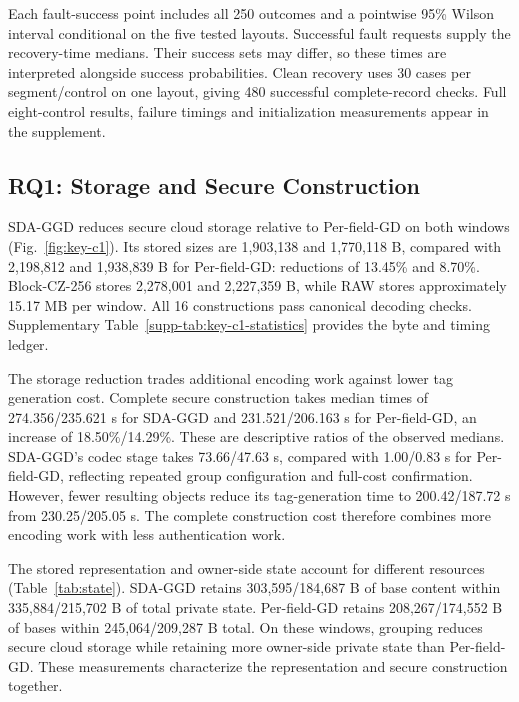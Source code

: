 \documentclass[10pt,journal]{IEEEtran}
\begin{document}
Each fault-success point includes all 250 outcomes and a pointwise 95\%
Wilson interval conditional on the five tested layouts. Successful fault
requests supply the recovery-time medians. Their success sets may differ,
so these times are interpreted alongside success probabilities. Clean
recovery uses 30 cases per segment/control on one layout, giving 480
successful complete-record checks. Full eight-control results, failure
timings and initialization measurements appear in the supplement.



\subsection{RQ1: Storage and Secure Construction}
SDA-GGD reduces secure cloud storage relative to Per-field-GD on both
windows (Fig.~\ref{fig:key-c1}). Its stored sizes are 1,903,138 and
1,770,118 B, compared with 2,198,812 and 1,938,839 B for Per-field-GD:
reductions of 13.45\% and 8.70\%. Block-CZ-256 stores 2,278,001 and
2,227,359 B, while RAW stores approximately 15.17 MB per window.
All 16 constructions pass canonical decoding checks. Supplementary
Table~\ref*{supp-tab:key-c1-statistics} provides the byte and timing ledger.

The storage reduction trades additional encoding work against lower tag
generation cost. Complete secure construction takes median times of 274.356/235.621 s for
SDA-GGD and 231.521/206.163 s for Per-field-GD, an increase of
18.50\%/14.29\%. These are descriptive ratios of the observed medians.
SDA-GGD's codec stage takes 73.66/47.63 s, compared with 1.00/0.83 s for
Per-field-GD, reflecting repeated group configuration and full-cost confirmation.
However, fewer resulting objects reduce its tag-generation time to
200.42/187.72 s from 230.25/205.05 s. The complete construction cost
therefore combines more encoding work with less authentication work.

The stored representation and owner-side state account for different
resources (Table~\ref{tab:state}). SDA-GGD retains 303,595/184,687 B of base content within
335,884/215,702 B of total private state. Per-field-GD retains
208,267/174,552 B of bases within 245,064/209,287 B total. On these windows, grouping reduces
secure cloud storage while retaining more owner-side private state than
Per-field-GD. These measurements characterize
the representation and secure construction together.
\end{document}
